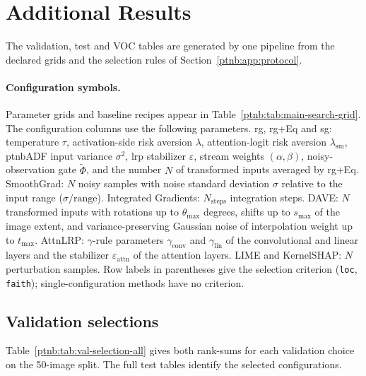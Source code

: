 


\section{Additional Results}\label{ptnb:app:results}

The validation, test and VOC tables are generated by one pipeline from the declared grids and the selection rules of Section~\ref{ptnb:app:protocol}.

\paragraph{Configuration symbols.}\label{ptnb:app:config-symbols}
Parameter grids and baseline recipes appear in Table~\ref{ptnb:tab:main-search-grid}. The configuration columns use the following parameters. \ac{rg}, \ac{rg}+Eq and \ac{sg}: temperature $\tau$, activation-side risk aversion $\lambda$, attention-logit risk aversion $\lambda_{\mathrm{sm}}$, \ac{ptnbADF} input variance $\sigma^2$, \ac{lrp} stabilizer $\varepsilon$, stream weights $(\alpha,\beta)$, noisy-observation gate $\tilde\Phi$, and the number $N$ of transformed inputs averaged by \ac{rg}+Eq. SmoothGrad: $N$ noisy samples with noise standard deviation $\sigma$ relative to the input range ($\sigma/\mathrm{range}$). Integrated Gradients: $N_{\mathrm{steps}}$ integration steps. DAVE: $N$ transformed inputs with rotations up to $\theta_{\max}$ degrees, shifts up to $s_{\max}$ of the image extent, and variance-preserving Gaussian noise of interpolation weight up to $t_{\max}$. AttnLRP: $\gamma$-rule parameters $\gamma_{\mathrm{conv}}$ and $\gamma_{\mathrm{lin}}$ of the convolutional and linear layers and the stabilizer $\varepsilon_{\mathrm{attn}}$ of the attention layers. LIME and KernelSHAP: $N$ perturbation samples. Row labels in parentheses give the selection criterion (\texttt{loc}, \texttt{faith}); single-configuration methods have no criterion.

\subsection{Validation selections}\label{ptnb:app:val-selection}

Table~\ref{ptnb:tab:val-selection-all} gives both rank-sums for each validation choice on the 50-image split. The full test tables identify the selected configurations.


